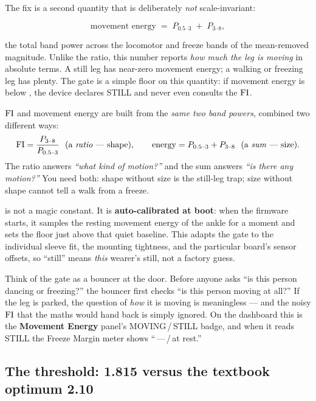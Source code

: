 The fix is a second quantity that is deliberately \emph{not} scale-invariant:

\begin{equation}
\text{movement energy} \;=\; P_{0.5\text{--}3}\;+\;P_{3\text{--}8},
\label{eq:energy}
\end{equation}

\noindent the total band power across the locomotor and freeze bands of the
mean-removed magnitude. Unlike the ratio, this number reports \emph{how much the
leg is moving} in absolute terms. A still leg has near-zero movement energy; a
walking or freezing leg has plenty. The gate is a simple floor on this quantity:
if movement energy is below , the device declares STILL and
never even consults the $\mathrm{FI}$.

\begin{mathsbox}
$\mathrm{FI}$ and movement energy are built from the \emph{same two band powers}, combined
two different ways:
\[
\FI=\frac{P_{3\text{--}8}}{P_{0.5\text{--}3}}\ \ (\text{a \emph{ratio} --- shape}),
\qquad
\text{energy}=P_{0.5\text{--}3}+P_{3\text{--}8}\ \ (\text{a \emph{sum} --- size}).
\]
The ratio answers \emph{``what kind of motion?''} and the sum answers \emph{``is
there any motion?''} You need both: shape without size is the still-leg trap;
size without shape cannot tell a walk from a freeze.
\end{mathsbox}

 is not a magic constant. It is \textbf{auto-calibrated at
boot}: when the firmware starts, it samples the resting movement energy of the
ankle for a moment and sets the floor just above that quiet baseline. This adapts
the gate to the individual sleeve fit, the mounting tightness, and the particular
board's sensor offsets, so ``still'' means \emph{this} wearer's still, not a
factory guess.

\begin{intuition}
Think of the gate as a bouncer at the door. Before anyone asks ``is this person
dancing or freezing?'' the bouncer first checks ``is this person moving at all?''
If the leg is parked, the question of \emph{how} it is moving is meaningless ---
and the noisy $\mathrm{FI}$ that the maths would hand back is simply ignored. On the
dashboard this is the \textbf{Movement Energy} panel's MOVING\,/\,STILL badge, and
when it reads STILL the Freeze Margin meter shows ``\,---\,/\,at rest.''
\end{intuition}

\subsection{The threshold: 1.815 versus the textbook optimum 2.10}

